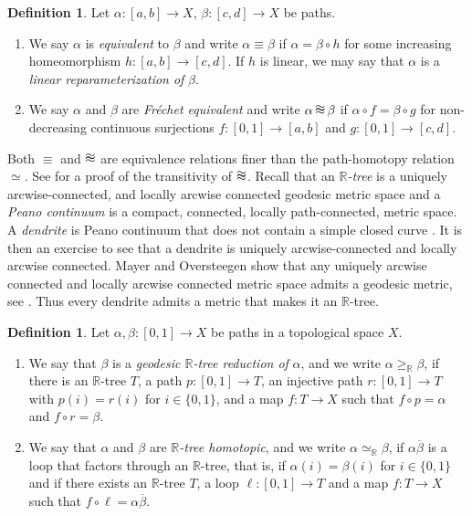 \documentclass[12pt, leqno]{amsart}
\newcommand{\tripprox}{\setbox0\hbox{$\approx$}%
\mbox{\makebox[0pt][l]{\raisebox{0.48\ht0}{$\approx$}}$\approx$}}
\newcommand{\tripproxs}{\,\setbox0\hbox{$\approx$}%
\mbox{\makebox[0pt][l]{\raisebox{0.48\ht0}{$\approx$}}$\approx$}\,}
\newcommand{\ui}{[0,1]}
\newcommand{\den}{\simeq_{\bbr}}
\newcommand{\bbr}{\mathbb{R}}
\newcommand{\ov}{\overline}
\theoremstyle{definition}\newtheorem{definition}[theorem]{Definition}
\begin{document}
\begin{definition}\label{deffrechet}
Let $\alpha:[a,b]\to X$, $\beta:[c,d]\to X$ be paths.
\begin{enumerate}
\item We say $\alpha$ is \textit{equivalent} to $\beta$ and write $\alpha\equiv\beta$ if $\alpha=\beta\circ h$ for some increasing homeomorphism $h: [a,b]\to [c,d]$. If $h$ is linear, we may say that $\alpha$ is a \textit{linear reparameterization of} $\beta$.
\item We say $\alpha$ and $\beta$ are \textit{Fr\'echet equivalent} and write $\alpha\tripproxs\beta$ if $\alpha\circ f=\beta\circ g$ for non-decreasing continuous surjections $f:\ui\to [a,b]$ and $g:\ui\to [c,d]$.
\end{enumerate}
\end{definition}
Both $\equiv$ and $\tripprox$ are equivalence relations finer than the path-homotopy relation $\simeq$. See \cite{CF} for a proof of the transitivity of $\tripprox$.  Recall that an \textit{$\bbr$-tree} is a uniquely arcwise-connected, and locally arcwise connected geodesic metric space \cite{bestvinartrees,MORtree} and a \emph{Peano continuum} is a compact, connected, locally path-connected, metric space.      A  \textit{dendrite} is Peano continuum that does not contain a simple closed curve \cite[Definition 10.1]{Nadler}. It is then an exercise to see that a dendrite is uniquely arcwise-connected and locally arcwise connected.  Mayer and Oversteegen show that any uniquely arcwise connected and locally arcwise connected metric space admits a geodesic metric, see \cite[Theorem 5.1]{MORtree}.  Thus every dendrite admits a metric that makes it an $\bbr$-tree.





\begin{definition}\label{defden}
Let $\alpha,\beta:\ui\to X$ be paths in a topological space $X$.
\begin{enumerate}
\item We say that $\beta$ is a \textit{geodesic $\bbr$-tree reduction of} $\alpha$, and we write $\alpha\geq_{\bbr}\beta$, if there is an $\bbr$-tree $T$, a path $p:\ui\to T$, an injective path $r:\ui\to T$ with $p(i)=r(i)$ for $i\in\{0,1\}$, and a map $f:T\to X$ such that $f\circ p=\alpha$ and $f\circ r=\beta$.
\item We say that $\alpha$ and $\beta$ are \textit{$\bbr$-tree homotopic}, and we write $\alpha\den\beta$, if $\alpha\ov{\beta}$ is a loop that factors through an $\bbr$-tree, that is, if $\alpha(i)=\beta(i)$ for $i\in\{0,1\}$ and if there exists an $\bbr$-tree $T$, a loop $\ell:\ui\to T$ and a map $f:T\to X$ such that $f\circ\ell=\alpha\ov{\beta}$.
\end{enumerate}
\end{definition}
\end{document}
